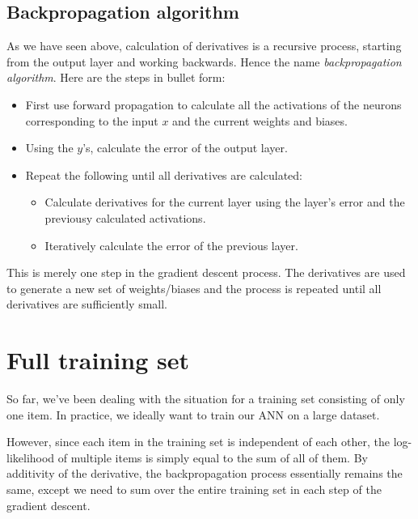\documentclass[12pt, a4paper]{article}
\numberwithin{equation}{section}
\begin{document}
\subsection{Backpropagation algorithm}
As we have seen above, calculation of derivatives is a recursive process, starting from the output layer and working backwards. Hence the name \textit{backpropagation algorithm}. Here are the steps in bullet form:
\begin{itemize}
\item First use forward propagation to calculate all the activations of the neurons corresponding to the input $x$ and the current weights and biases.
\item Using the $y$'s, calculate the error of the output layer.
\item Repeat the following until all derivatives are calculated:
\begin{itemize}
\item Calculate derivatives for the current layer using the layer's error and the previousy calculated activations.
\item Iteratively calculate the error of the previous layer.
\end{itemize}
\end{itemize}
This is merely one step in the gradient descent process. The derivatives are used to generate a new set of weights/biases and the process is repeated until all derivatives are sufficiently small.

\section{Full training set}
So far, we've been dealing with the situation for a training set consisting of only one item. In practice, we ideally want to train our ANN on a large dataset.

However, since each item in the training set is independent of each other, the log-likelihood of multiple items is simply equal to the sum of all of them. By additivity of the derivative, the backpropagation process essentially remains the same, except we need to sum over the entire training set in each step of the gradient descent.
\end{document}
